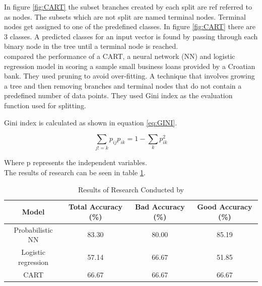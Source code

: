 \vspace{15pt}

In figure \ref{fig:CART} the subset branches created by each split are ref referred to as nodes. The subsets which are not split are named terminal nodes. Terminal nodes get assigned to one of the predefined classes. In figure \ref{fig:CART} there are 3 classes. A predicted classes for an input vector is found by passing through each binary node in the tree until a terminal node is reached. \\

\textcite{DecTreesZekic} compared the performance of a CART, a neural network (NN) and logistic regression model in scoring a sample small business loans provided by a Croatian bank. They used pruning to avoid over-fitting. A technique that involves growing a tree and then removing branches and terminal nodes that do not contain a predefined number of data points. They used Gini index as the evaluation function used for splitting. \newpage


Gini index is calculated as shown in equation \ref{eq:GINI}. 

\vspace{15pt}

\begin{equation} \label{eq:GINI}
\sum_{j!=k}p_{ij}p_{ik} = 1 - \sum_{k}p_{ik}^{2}
\end{equation}
\vspace{15pt}

Where p represents the independent variables. \\


The results of \textcite{DecTreesZekic} research can be seen in table \ref{table:CART}. \\


\begin{table}[H]
\begin{center}
\begin{tabular}{|c|c|c|c|} 
\hline
\multicolumn{1}{|c}{Model}  &\multicolumn{1}{|c|}{Total Accuracy (\%)}  &\multicolumn{1}{|c|}{Bad Accuracy (\%)} & \multicolumn{1}{c|}{Good Accuracy (\%)}\\
\hline
Probabilistic NN & 83.30 &  80.00 & 85.19 \\
\hline
Logistic regression & 57.14 &  66.67 & 51.85 \\
\hline
CART & 66.67 &  66.67 & 66.67 \\
\hline
\end{tabular}
\end{center}
\caption{Results of Research Conducted by \textcite{DecTreesZekic} }
\label{table:CART}
\end{table}

